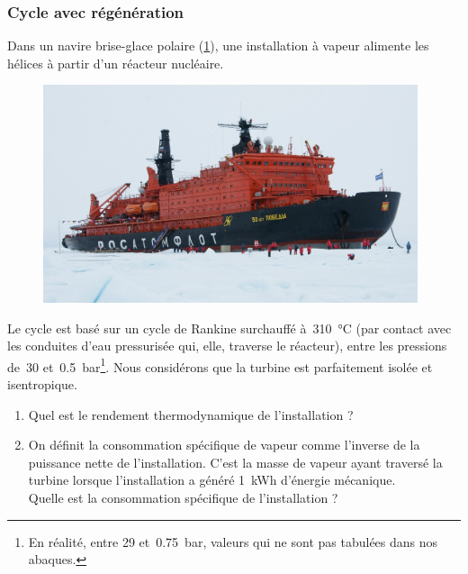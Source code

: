 \subsubsection{Cycle avec régénération}

	Dans un navire brise-glace polaire (\cref{fig_50letpodeby}), une installation à vapeur alimente les hélices à partir d’un réacteur nucléaire.

	\begin{figure}
		\begin{center}
			\includegraphics[width=11cm]{images/50letpodeby.jpg}
		\end{center}
		\label{fig_50letpodeby}
	\end{figure}

	Le cycle est basé sur un cycle de Rankine surchauffé à~\SI{310}{\degreeCelsius} (par contact avec les conduites d’eau pressurisée qui, elle, traverse le réacteur), entre les pressions de~\num{30} et~\SI{0,5}{\bar}\footnote{En réalité, entre \num{29} et~\SI{0,75}{\bar}, valeurs qui ne sont pas tabulées dans nos abaques.}. Nous considérons que la turbine est parfaitement isolée et isentropique.%

	\begin{enumerate}
		\item Quel est le rendement thermodynamique de l’installation ?
		\item On définit la consommation spécifique de vapeur comme l’inverse de la puissance nette de l’installation. C’est la masse de vapeur ayant traversé la turbine lorsque l’installation a généré \SI{1}{\kWh} d’énergie mécanique.\\
			Quelle est la consommation spécifique de l’installation ?
	\end{enumerate}

